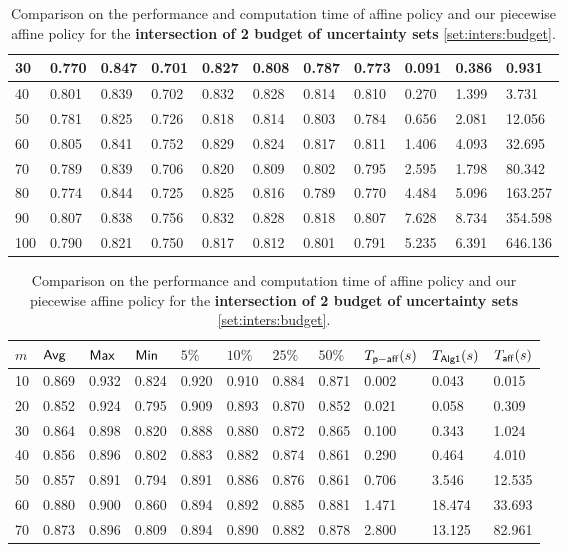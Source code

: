 \documentclass[11pt]{article}
\theoremstyle{plain}
\theoremstyle{definition}
\numberwithin{equation}{section}%
\numberwithin{equation}{section}%
\begin{document}
\begin{table}[]
{\begin{tabular}{|l|l|l|l|l|l|l|l|l|l|l|}
30  & 0.770 & 0.847 & 0.701 & 0.827 & 0.808 & 0.787 & 0.773 & 0.091 & 0.386 & 0.931   \\\hline
40  & 0.801 & 0.839 & 0.702 & 0.832 & 0.828 & 0.814 & 0.810 & 0.270 & 1.399 & 3.731   \\\hline
50  & 0.781 & 0.825 & 0.726 & 0.818 & 0.814 & 0.803 & 0.784 & 0.656 & 2.081 & 12.056  \\\hline
60  & 0.805 & 0.841 & 0.752 & 0.829 & 0.824 & 0.817 & 0.811 & 1.406 & 4.093 & 32.695  \\\hline
70  & 0.789 & 0.839 & 0.706 & 0.820 & 0.809 & 0.802 & 0.795 & 2.595 & 1.798 & 80.342  \\\hline
80  & 0.774 & 0.844 & 0.725 & 0.825 & 0.816 & 0.789 & 0.770 & 4.484 & 5.096 & 163.257 \\\hline
90  & 0.807 & 0.838 & 0.756 & 0.832 & 0.828 & 0.818 & 0.807 & 7.628 & 8.734 & 354.598 \\\hline
100 & 0.790 & 0.821 & 0.750 & 0.817 & 0.812 & 0.801 & 0.791 & 5.235 & 6.391 & 646.136\\\hline
\end{tabular}%
\caption{Comparison on the performance and computation time of affine policy and our piecewise affine policy for the {\bf intersection of 2 budget of uncertainty sets} \eqref{set:inters:budget}.}
\label{tab:simu:2bud}
\bigskip
\begin{tabular}{|l|l|l|l|l|l|l|l|l|l|l|}
\hline
$m$ & ${\sf Avg}$ &  ${\sf Max}$& ${\sf Min}$ &   $5\%$ & $10\%$ &  $25\%$  & $50\%$  & $T_{\sf p-aff}(s)$ & $T_{\sf Alg1}(s)$ & $T_{\sf aff}(s)$\\ \hline
10  & 0.869 & 0.932 & 0.824 & 0.920 & 0.910 & 0.884 & 0.871 & 0.002 & 0.043   & 0.015   \\\hline
20  & 0.852 & 0.924 & 0.795 & 0.909 & 0.893 & 0.870 & 0.852 & 0.021 & 0.058   & 0.309   \\\hline
30  & 0.864 & 0.898 & 0.820 & 0.888 & 0.880 & 0.872 & 0.865 & 0.100 & 0.343   & 1.024   \\\hline
40  & 0.856 & 0.896 & 0.802 & 0.883 & 0.882 & 0.874 & 0.861 & 0.290 & 0.464   & 4.010   \\\hline
50  & 0.857 & 0.891 & 0.794 & 0.891 & 0.886 & 0.876 & 0.861 & 0.706 & 3.546   & 12.535  \\\hline
60  & 0.880 & 0.900 & 0.860 & 0.894 & 0.892 & 0.885 & 0.881 & 1.471 & 18.474  & 33.693  \\\hline
70  & 0.873 & 0.896 & 0.809 & 0.894 & 0.890 & 0.882 & 0.878 & 2.800 & 13.125  & 82.961  \\\hline

\end{tabular}}
\end{table}
\end{document}
